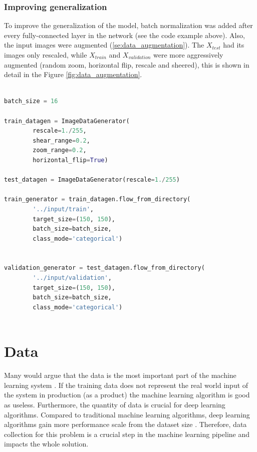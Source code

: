 \documentclass[times, utf8, diplomski]{fer}
\begin{document}
\subsection{Improving generalization}

To improve the generalization of the model, batch normalization was added after every fully-connected layer in the network (see the code example above). Also, the input images were augmented (\ref{se:data_augmentation}). The $X_{test}$ had its images only rescaled, while $X_{train}$ and $X_{validation}$ were more aggressively augmented (random zoom, horizontal flip, rescale and sheered), this is shown in detail in the Figure \ref{fig:data_augmentation}.

\begin{lstlisting}[language=Python, caption=Data augmentation of the input dataset (images)]

batch_size = 16

train_datagen = ImageDataGenerator(
        rescale=1./255,
        shear_range=0.2,
        zoom_range=0.2,
        horizontal_flip=True)

test_datagen = ImageDataGenerator(rescale=1./255)

train_generator = train_datagen.flow_from_directory(
        '../input/train',
        target_size=(150, 150),
        batch_size=batch_size,
        class_mode='categorical') 


validation_generator = test_datagen.flow_from_directory(
        '../input/validation',
        target_size=(150, 150),
        batch_size=batch_size,
        class_mode='categorical')
        
\end{lstlisting}

\chapter{Data}

Many would argue that the data is the most important part of the machine learning system \citep{deep_learning}. If the training data does not represent the real world input of the system in production (as a product) the machine learning algorithm is good as useless. Furthermore, the quantity of data is crucial for deep learning algorithms. Compared to traditional machine learning algorithms, deep learning algorithms gain more performance scale from the dataset size \citep{deep_learning}. Therefore, data collection for this problem is a crucial step in the machine learning pipeline and impacts the whole solution.
\end{document}
